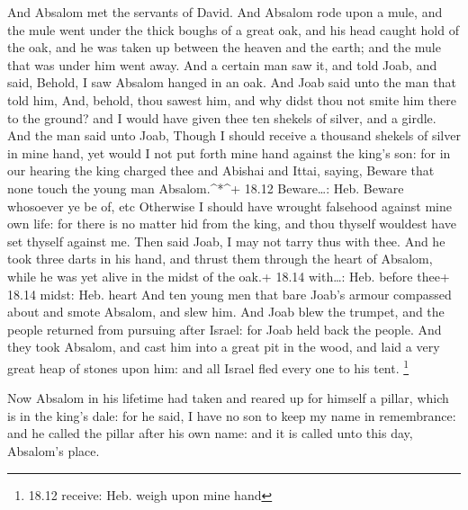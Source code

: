  And Absalom met the servants of David. And Absalom rode
upon a mule, and the mule went under the thick boughs of a great oak,
and his head caught hold of the oak, and he was taken up between the
heaven and the earth; and the mule that was under him went away.
 And a certain man saw it, and told Joab, and said, Behold,
I saw Absalom hanged in an oak.  And Joab said unto the man
that told him, And, behold, thou sawest him, and why didst thou not
smite him there to the ground? and I would have given thee ten shekels
of silver, and a girdle.  And the man said unto Joab,
Though I should receive a thousand shekels of silver in mine hand, yet
would I not put forth mine hand against the king's son: for in our
hearing the king charged thee and Abishai and Ittai, saying, Beware that
none touch the young man Absalom.\^{}*\^{}+ 18.12 Beware\ldots: Heb.
Beware whosoever ye be of, etc  Otherwise I should have
wrought falsehood against mine own life: for there is no matter hid from
the king, and thou thyself wouldest have set thyself against me.
 Then said Joab, I may not tarry thus with thee. And he
took three darts in his hand, and thrust them through the heart of
Absalom, while he was yet alive in the midst of the oak.+ 18.14
with\ldots: Heb. before thee+ 18.14 midst: Heb. heart  And
ten young men that bare Joab's armour compassed about and smote Absalom,
and slew him.  And Joab blew the trumpet, and the people
returned from pursuing after Israel: for Joab held back the people.
 And they took Absalom, and cast him into a great pit in
the wood, and laid a very great heap of stones upon him: and all Israel
fled every one to his tent. \footnote{18.12 receive: Heb. weigh upon
  mine hand}

 Now Absalom in his lifetime had taken and reared up for
himself a pillar, which is in the king's dale: for he said, I have no
son to keep my name in remembrance: and he called the pillar after his
own name: and it is called unto this day, Absalom's place.

